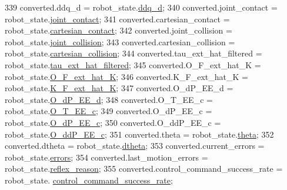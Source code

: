 \begin{DoxyCode}
339   converted.ddq\_d = robot\_state.\hyperlink{structresearch__interface_1_1robot_1_1RobotState_a4f04c24653108cc9c45aad3d091131a6}{ddq\_d};
340   converted.joint\_contact = robot\_state.\hyperlink{structresearch__interface_1_1robot_1_1RobotState_a79a76bc6457428444d91fb7877233156}{joint\_contact};
341   converted.cartesian\_contact = robot\_state.\hyperlink{structresearch__interface_1_1robot_1_1RobotState_a0a4d7e24f71507c25f567f145cd99f87}{cartesian\_contact};
342   converted.joint\_collision = robot\_state.\hyperlink{structresearch__interface_1_1robot_1_1RobotState_a84fde387cce0a855a6cb620f7de4d06c}{joint\_collision};
343   converted.cartesian\_collision = robot\_state.\hyperlink{structresearch__interface_1_1robot_1_1RobotState_a26957c17524dd6dbe3b8327db571403a}{cartesian\_collision};
344   converted.tau\_ext\_hat\_filtered = robot\_state.\hyperlink{structresearch__interface_1_1robot_1_1RobotState_a05a75a665b3e0469299a49c3651ae8f5}{tau\_ext\_hat\_filtered};
345   converted.O\_F\_ext\_hat\_K = robot\_state.\hyperlink{structresearch__interface_1_1robot_1_1RobotState_ae521232c3bef7d6a66145a852149e0e1}{O\_F\_ext\_hat\_K};
346   converted.K\_F\_ext\_hat\_K = robot\_state.\hyperlink{structresearch__interface_1_1robot_1_1RobotState_a0bde767e50880d3ced2dabe7b464890c}{K\_F\_ext\_hat\_K};
347   converted.O\_dP\_EE\_d = robot\_state.\hyperlink{structresearch__interface_1_1robot_1_1RobotState_aa8db400627815023275151f75b0dec35}{O\_dP\_EE\_d};
348   converted.O\_T\_EE\_c = robot\_state.\hyperlink{structresearch__interface_1_1robot_1_1RobotState_aad3e61ffb4787a8a227675ee26ab0b8f}{O\_T\_EE\_c};
349   converted.O\_dP\_EE\_c = robot\_state.\hyperlink{structresearch__interface_1_1robot_1_1RobotState_a79a43551761a4847e2e96385ecb3a5c8}{O\_dP\_EE\_c};
350   converted.O\_ddP\_EE\_c = robot\_state.\hyperlink{structresearch__interface_1_1robot_1_1RobotState_a0ad4e2b778593074b619dd0f24372774}{O\_ddP\_EE\_c};
351   converted.theta = robot\_state.\hyperlink{structresearch__interface_1_1robot_1_1RobotState_a7f1eca05ce359a0c4aed4c2525f2edd0}{theta};
352   converted.dtheta = robot\_state.\hyperlink{structresearch__interface_1_1robot_1_1RobotState_ac13d914b6a151e093a2067c134a0d5c0}{dtheta};
353   converted.current\_errors = robot\_state.\hyperlink{structresearch__interface_1_1robot_1_1RobotState_aee6227a9ca54cfd074844ae0325646b5}{errors};
354   converted.last\_motion\_errors = robot\_state.\hyperlink{structresearch__interface_1_1robot_1_1RobotState_a173478c94fcf79e6aa2477742eaf1201}{reflex\_reason};
355   converted.control\_command\_success\_rate = robot\_state.
      \hyperlink{structresearch__interface_1_1robot_1_1RobotState_acfa9abdc95abc44b60eb3cd2cc82d37e}{control\_command\_success\_rate};

\end{DoxyCode}
